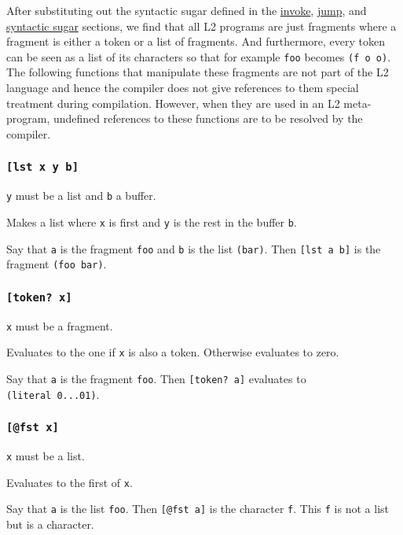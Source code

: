 \documentclass[]{article}
\begin{document}
After substituting out the syntactic sugar defined in the
\protect\hyperlink{invoke}{invoke}, \protect\hyperlink{jump}{jump}, and
\protect\hyperlink{syntactic-sugar}{syntactic sugar} sections, we find
that all L2 programs are just fragments where a fragment is either a
token or a list of fragments. And furthermore, every token can be seen
as a list of its characters so that for example \texttt{foo} becomes
\texttt{(f\ o\ o)}. The following functions that manipulate these
fragments are not part of the L2 language and hence the compiler does
not give references to them special treatment during compilation.
However, when they are used in an L2 meta-program, undefined references
to these functions are to be resolved by the compiler.

\subsubsection{\texorpdfstring{\texttt{{[}lst\ x\ y\ b{]}}}{{[}lst x y b{]}}}\label{lst-x-y-b}

\texttt{y} must be a list and \texttt{b} a buffer.

Makes a list where \texttt{x} is first and \texttt{y} is the rest in the
buffer \texttt{b}.

Say that \texttt{a} is the fragment \texttt{foo} and \texttt{b} is the
list \texttt{(bar)}. Then \texttt{{[}lst\ a\ b{]}} is the fragment
\texttt{(foo\ bar)}.

\subsubsection{\texorpdfstring{\texttt{{[}token?\ x{]}}}{{[}token? x{]}}}\label{token-x}

\texttt{x} must be a fragment.

Evaluates to the one if \texttt{x} is also a token. Otherwise evaluates
to zero.

Say that \texttt{a} is the fragment \texttt{foo}. Then
\texttt{{[}token?\ a{]}} evaluates to \texttt{(literal\ 0...01)}.

\subsubsection{\texorpdfstring{\texttt{{[}@fst\ x{]}}}{{[}@fst x{]}}}\label{fst-x}

\texttt{x} must be a list.

Evaluates to the first of \texttt{x}.

Say that \texttt{a} is the list \texttt{foo}. Then
\texttt{{[}@fst\ a{]}} is the character \texttt{f}. This \texttt{f} is
not a list but is a character.
\end{document}
